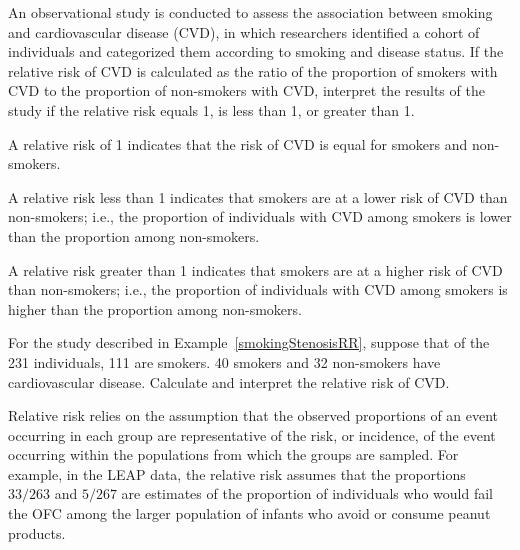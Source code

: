 \textD{\newpage}

\begin{examplewrap}
\begin{nexample}{An observational study is conducted to assess the association between smoking and cardiovascular disease (CVD), in which researchers identified a cohort of individuals and categorized them according to smoking and disease status. If the relative risk of CVD is calculated as the ratio of the proportion of smokers with CVD to the proportion of non-smokers with CVD, interpret the results of the study if the relative risk equals 1, is less than 1, or greater than 1.}
	
A relative risk of 1 indicates that the risk of CVD is equal for smokers and non-smokers.

A relative risk less than 1 indicates that smokers are at a lower risk of CVD than non-smokers; i.e., the proportion of individuals with CVD among smokers is lower than the proportion among non-smokers.
	
A relative risk greater than 1 indicates that smokers are at a higher risk of CVD than non-smokers; i.e., the proportion of individuals with CVD among smokers is higher than the proportion among non-smokers.
	
\label{smokingStenosisRR}	
\end{nexample}
\end{examplewrap}

\begin{exercisewrap}
\begin{nexercise}
For the study described in Example~\ref{smokingStenosisRR}, suppose that of the 231 individuals, 111 are smokers. 40 smokers and 32 non-smokers have cardiovascular disease. Calculate and interpret the relative risk of CVD.\footnotemark{}
\end{nexercise}
\end{exercisewrap}

Relative risk relies on the assumption that the observed proportions of an event occurring in each group are representative of the risk, or incidence, of the event occurring within the populations from which the groups are sampled. For example, in the LEAP data, the relative risk assumes that the proportions $33/263$ and $5/267$ are estimates of the proportion of individuals who would fail the OFC among the larger population of infants who avoid or consume peanut products. 

